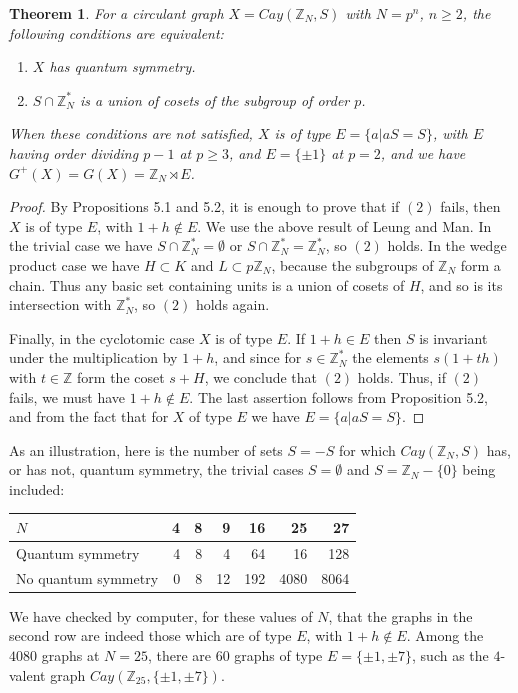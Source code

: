 \documentclass[11pt]{amsart}
\newtheorem{theorem}{Theorem}[section]
\newcommand{\Z}{\mathbb Z}
\begin{document}
\begin{theorem}
For a circulant graph $X=Cay(\Z_N,S)$ with $N=p^n$, $n\geq2$, the following conditions are equivalent:
\begin{enumerate}
\item $X$ has quantum symmetry.
\item $S\cap\Z_N^*$ is a union of cosets of the subgroup of order $p$.
\end{enumerate}
When these conditions are not satisfied, $X$ is of type $E=\{a|aS=S\}$, with $E$ having order dividing $p-1$ at $p\geq3$, and $E=\{\pm1\}$ at $p=2$, and we have $G^+(X)=G(X)=\Z_N\rtimes E$.
\end{theorem}

\begin{proof}
By Propositions 5.1 and 5.2, it is enough to prove that if $(2)$ fails, then $X$ is of type $E$, with $1+h\notin E$. We use the above result of Leung and Man. In the trivial case we have $S\cap\Z_N^*=\emptyset$ or $S\cap\Z_N^*=\Z_N^*$, so $(2)$ holds. In the wedge product case we have $H\subset K$ and $L\subset p\Z_N$, because the subgroups of $\Z_N$ form a chain. Thus any basic set containing units is a union of cosets of $H$, and so is its intersection with $\Z_N^*$, so $(2)$ holds again.

Finally, in the cyclotomic case $X$ is of type $E$. If $1+h\in E$ then $S$ is invariant under the multiplication by $1+h$, and since for $s\in\Z_N^*$ the elements $s(1+th)$ with $t\in\Z$ form the coset $s+H$, we conclude that $(2)$ holds. Thus, if $(2)$ fails, we must have $1+h\notin E$. The last assertion follows from Proposition 5.2, and from the fact that for $X$ of type $E$ we have $E=\{a|aS=S\}$.
\end{proof}

As an illustration, here is the number of sets $S=-S$ for which $Cay(\Z_N,S)$ has, or has not, quantum symmetry, the trivial cases $S=\emptyset$ and $S=\Z_N-\{0\}$ being included:
\begin{center}
\begin{tabular}{lrrrrrr}
\toprule
$N$&4&8&9&16&25&27\\
\midrule
Quantum symmetry&4&8&4&64&16&128\\
No quantum symmetry&0&8&12&192&4080&8064\\
\bottomrule
\end{tabular}
\end{center}

We have checked by computer, for these values of $N$, that the graphs in the second row are indeed those which are of type $E$, with $1+h\notin E$. Among the $4080$ graphs at $N=25$, there are $60$ graphs of type $E=\{\pm1,\pm7\}$, such as the $4$-valent graph $Cay(\Z_{25},\{\pm1,\pm7\})$.
\end{document}
